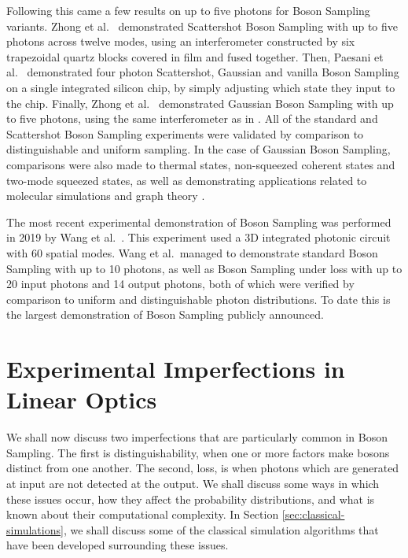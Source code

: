 Following this came a few results on up to five photons for Boson Sampling variants. Zhong et al.~\cite{zhong2018} demonstrated Scattershot Boson Sampling with up to five photons across twelve modes, using an interferometer constructed by six trapezoidal quartz blocks covered in film and fused together. Then, Paesani et al.~\cite{paesani2018} demonstrated four photon Scattershot, Gaussian and vanilla Boson Sampling on a single integrated silicon chip, by simply adjusting which state they input to the chip. Finally, Zhong et al.~\cite{zhong2019} demonstrated Gaussian Boson Sampling with up to five photons, using the same interferometer as in \cite{zhong2018}. All of the standard and Scattershot Boson Sampling experiments were validated by comparison to distinguishable and uniform sampling. In the case of Gaussian Boson Sampling, comparisons were also made to thermal states, non-squeezed coherent states and two-mode squeezed states, as well as demonstrating applications related to molecular simulations and graph theory \cite{paesani2018, zhong2019}.

The most recent experimental demonstration of Boson Sampling was performed in 2019 by Wang et al.~\cite{wang2019}. This experiment used a 3D integrated photonic circuit with 60 spatial modes. Wang et al.\ managed to demonstrate standard Boson Sampling with up to 10 photons, as well as Boson Sampling under loss with up to 20 input photons and 14 output photons, both of which were verified by comparison to uniform and distinguishable photon distributions. To date this is the largest demonstration of Boson Sampling publicly announced.

\section{Experimental Imperfections in Linear Optics}
\label{sec:lo-imperfections}

We shall now discuss two imperfections that are particularly common in Boson Sampling. The first is distinguishability, when one or more factors make bosons distinct from one another. The second, loss, is when photons which are generated at input are not detected at the output. We shall discuss some ways in which these issues occur, how they affect the probability distributions, and what is known about their computational complexity. In Section \ref{sec:classical-simulations}, we shall discuss some of the classical simulation algorithms that have been developed surrounding these issues.

